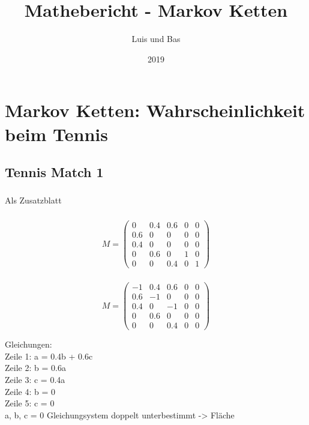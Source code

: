 \documentclass{article}
\title{Mathebericht - Markov Ketten}
\author{Luis und Bas}
\date{2019}
\begin{document}
\maketitle


\section{Markov Ketten: Wahrscheinlichkeit beim Tennis}
\subsection{Tennis Match 1}
\subsubsection{} Als Zusatzblatt
\subsubsection{} 
\[
M=
  \begin{pmatrix}
    0 & 0.4 & 0.6 & 0 & 0 \\
    0.6 & 0 & 0 & 0 & 0 \\
    0.4 & 0 & 0 & 0 & 0 \\
    0 & 0.6 & 0 & 1 & 0 \\
    0 & 0 & 0.4 & 0 & 1
    
  \end{pmatrix}
\]
\subsubsection{}
\[
M=
  \begin{pmatrix}
    -1 & 0.4 & 0.6 & 0 & 0 \\
    0.6 & -1 & 0 & 0 & 0 \\
    0.4 & 0 & -1 & 0 & 0 \\
    0 & 0.6 & 0 & 0 & 0 \\
    0 & 0 & 0.4 & 0 & 0
    
  \end{pmatrix}
\]

\vspace{5mm}
Gleichungen: \\
Zeile 1: a = 0.4b + 0.6c \\
Zeile 2: b = 0.6a \\
Zeile 3: c = 0.4a \\
Zeile 4: b = 0 \\
Zeile 5: c = 0 \\

\vspace{5mm}
a, b, c = 0
Gleichungsystem doppelt unterbestimmt -> Fläche
\end{document}
